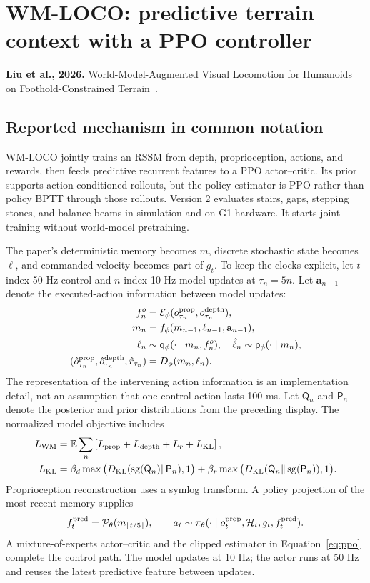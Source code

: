 \section{WM-LOCO: predictive terrain context with a PPO controller}\label{sec:wmloco}
\textbf{Liu et al., 2026.} World-Model-Augmented Visual Locomotion for
Humanoids on Foothold-Constrained Terrain~\cite{wmloco}.

\subsection{Reported mechanism in common notation}
WM-LOCO jointly trains an RSSM from depth, proprioception, actions, and rewards,
then feeds predictive recurrent features to a PPO actor--critic. Its prior
supports action-conditioned rollouts, but the policy estimator is PPO rather
than policy BPTT through those rollouts. Version 2 evaluates stairs, gaps,
stepping stones, and balance beams in simulation and on G1 hardware. It starts
joint training without world-model pretraining.

The paper's deterministic memory becomes $m$, discrete stochastic state becomes $\ell$,
and commanded velocity becomes part of $g_t$. To keep the clocks explicit,
let $t$ index 50 Hz control and $n$ index 10 Hz model updates at $\tau_n=5n$.
Let $\mathbf a_{n-1}$ denote the executed-action information between model updates:
\begin{align}
f_n^o&=\mathcal E_\phi(o_{\tau_n}^{\rm prop},o_{\tau_n}^{\rm depth}),\\
m_n&=f_\phi(m_{n-1},\ell_{n-1},\mathbf a_{n-1}),\\
\ell_n&\sim\mathsf q_\phi(\cdot\mid m_n,f_n^o),\quad
\hat\ell_n\sim\mathsf p_\phi(\cdot\mid m_n),\\
(\hat o_{\tau_n}^{\rm prop},\hat o_{\tau_n}^{\rm depth},\hat r_{\tau_n})&=D_\phi(m_n,\ell_n).
\end{align}
The representation of the intervening action information is an implementation
detail, not an assumption that one control action lasts 100 ms.
Let $\mathsf Q_n$ and $\mathsf P_n$ denote the posterior and prior distributions
from the preceding display. The normalized model objective includes
\begin{align}
L_{\rm WM}&=\mathbb E\sum_n\left[L_{\rm prop}+L_{\rm depth}+L_r+L_{\rm KL}\right],\\
L_{\rm KL}&=\beta_d\max\big(D_{\mathrm{KL}}(\operatorname{sg}(\mathsf Q_n)\|\mathsf P_n),1\big)
+\beta_r\max\big(D_{\mathrm{KL}}(\mathsf Q_n\|\operatorname{sg}(\mathsf P_n)),1\big).
\end{align}
Proprioception reconstruction uses a symlog transform. A policy projection
of the most recent memory supplies
\begin{equation}
f_t^{\rm pred}=\mathcal P_\theta(m_{\lfloor t/5\rfloor}),\qquad
a_t\sim\pi_\theta(\cdot\mid o_t^{\rm prop},\mathcal H_t,g_t,f_t^{\rm pred}).
\end{equation}
A mixture-of-experts actor--critic and the clipped estimator in
Equation~\eqref{eq:ppo} complete the control path. The model updates at 10 Hz;
the actor runs at 50 Hz and reuses the latest predictive feature between updates.

